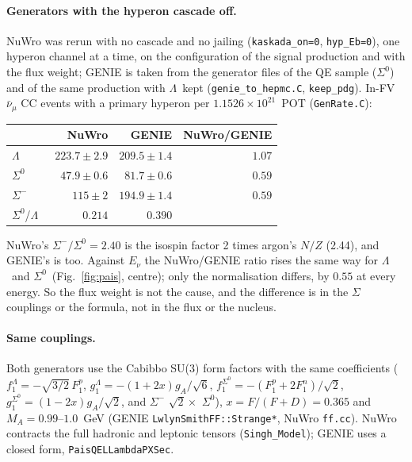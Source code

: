 \documentclass[11pt,a4paper]{article}
\newcommand{\Szero}{\ensuremath{\Sigma^{0}}}
\newcommand{\Lam}{\ensuremath{\Lambda}}
\newcommand{\numubar}{\ensuremath{\bar{\nu}_\mu}}
\begin{document}
\paragraph{Generators with the hyperon cascade off.} NuWro was rerun with no cascade
and no jailing (\texttt{kaskada\_on=0}, \texttt{hyp\_Eb=0}), one hyperon channel at a
time, on the configuration of the signal production and with the flux weight; GENIE is
taken from the generator files of the QE sample (\Szero) and of the same production
with \Lam\ kept (\texttt{genie\_to\_hepmc.C}, \texttt{keep\_pdg}). In-FV
$\numubar$ CC events with a primary hyperon per $1.1526\times10^{21}$~POT
(\texttt{GenRate.C}):
\begin{center}
\small
\begin{tabular}{lrrr}
\toprule
 & NuWro & GENIE & NuWro/GENIE \\
\midrule
\Lam\         & $223.7\pm2.9$ & $209.5\pm1.4$ & $1.07$ \\
\Szero\       & $47.9\pm0.6$  & $81.7\pm0.6$  & $0.59$ \\
$\Sigma^-$    & $115\pm2$     & $194.9\pm1.4$ & $0.59$ \\
\midrule
\Szero/\Lam\  & $0.214$ & $0.390$ & \\
\bottomrule
\end{tabular}
\end{center}
NuWro's $\Sigma^-/\Szero=2.40$ is the isospin factor 2 times argon's $N/Z$ (2.44), and
GENIE's is too. Against $E_\nu$ the NuWro/GENIE ratio rises the same way for \Lam\
and \Szero\ (Fig.~\ref{fig:pais}, centre); only the normalisation differs, by
$0.55$ at every energy. So the flux weight is not the cause, and the difference is in
the $\Sigma$ couplings or the formula, not in the flux or the nucleus.

\paragraph{Same couplings.} Both generators use the Cabibbo SU(3) form factors with the
same coefficients ($f_1^{\Lam}=-\sqrt{3/2}\,F_1^p$, $g_1^{\Lam}=-(1+2x)g_A/\sqrt6$,
$f_1^{\Szero}=-(F_1^p+2F_1^n)/\sqrt2$, $g_1^{\Szero}=(1-2x)g_A/\sqrt2$, and $\Sigma^-$
$\sqrt2\times$ \Szero), $x=F/(F+D)=0.365$ and $M_A=0.99$--$1.0$~GeV
(GENIE \texttt{LwlynSmithFF::Strange*}, NuWro \texttt{ff.cc}). NuWro contracts the full
hadronic and leptonic tensors (\texttt{Singh\_Model}); GENIE uses a closed form,
\texttt{PaisQELLambdaPXSec}.
\end{document}
